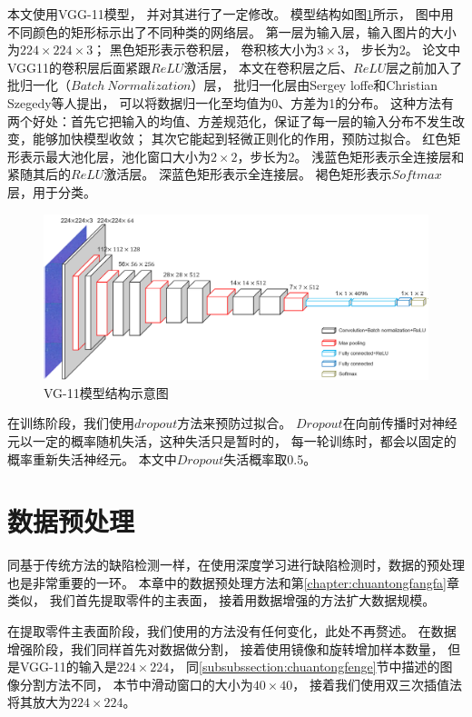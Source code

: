 本文使用VGG-11\cite{simonyan2014very}模型，
并对其进行了一定修改。
模型结构如图\ref{fig:VGG}所示，
图中用不同颜色的矩形标示出了不同种类的网络层。
第一层为输入层，输入图片的大小为$224\times224\times3$；
黑色矩形表示卷积层，
卷积核大小为$3\times3$，
步长为2。
论文中VGG11的卷积层后面紧跟$ReLU$激活层，
本文在卷积层之后、$ReLU$层之前加入了批归一化（$Batch~Normalization$）层，
批归一化层由Sergey loffe和Christian Szegedy等人提出，
可以将数据归一化至均值为0、方差为1的分布。
这种方法有两个好处：首先它把输入的均值、方差规范化，保证了每一层的输入分布不发生改变，能够加快模型收敛；
其次它能起到轻微正则化的作用，预防过拟合。
红色矩形表示最大池化层，池化窗口大小为$2\times2$，步长为2。
浅蓝色矩形表示全连接层和紧随其后的$ReLU$激活层。
深蓝色矩形表示全连接层。
褐色矩形表示$Softmax$层，用于分类。

\begin{figure}[htbp]
\centering
\includegraphics[width=1.0\linewidth]{figures/VGG.png}
\caption{VG-11模型结构示意图}
\label{fig:VGG}
\end{figure}

在训练阶段，我们使用$dropout$方法来预防过拟合。
$Dropout$在向前传播时对神经元以一定的概率随机失活，这种失活只是暂时的，
每一轮训练时，都会以固定的概率重新失活神经元。
本文中$Dropout$失活概率取0.5。


\section{数据预处理}

同基于传统方法的缺陷检测一样，在使用深度学习进行缺陷检测时，数据的预处理也是非常重要的一环。
本章中的数据预处理方法和第\ref{chapter:chuantongfangfa}章类似，
我们首先提取零件的主表面，
接着用数据增强的方法扩大数据规模。

在提取零件主表面阶段，我们使用的方法没有任何变化，此处不再赘述。
在数据增强阶段，我们同样首先对数据做分割，
接着使用镜像和旋转增加样本数量，
但是VGG-11的输入是$224\times 224$，
同\ref{subsubssection:chuantongfenge}节中描述的图像分割方法不同，
本节中滑动窗口的大小为$40\times 40$，
接着我们使用双三次插值法将其放大为$224\times 224$。

